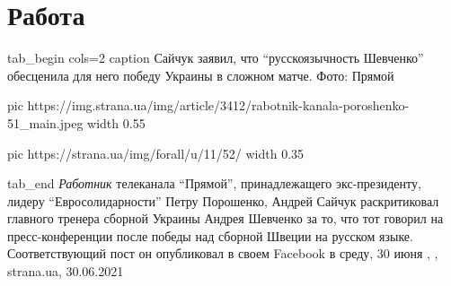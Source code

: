  
 
 
 
 
\chapter{Работа}
\label{sec:slova.rabota}

\ifcmt
tab_begin cols=2
	caption Сайчук заявил, что \enquote{русскоязычность Шевченко} обесценила для него победу Украины в сложном матче. Фото: Прямой

  pic https://img.strana.ua/img/article/3412/rabotnik-kanala-poroshenko-51_main.jpeg
	width 0.55

	pic https://strana.ua/img/forall/u/11/52/%
	width 0.35

tab_end
\fi
\emph{Работник} телеканала \enquote{Прямой}, принадлежащего экс-президенту, лидеру
\enquote{Евросолидарности} Петру Порошенко, Андрей Сайчук раскритиковал главного
тренера сборной Украины Андрея Шевченко за то, что тот говорил на
пресс-конференции после победы над сборной Швеции на русском языке.
Соответствующий пост он опубликовал в своем Facebook в среду, 30 июня
, , strana.ua, 30.06.2021

